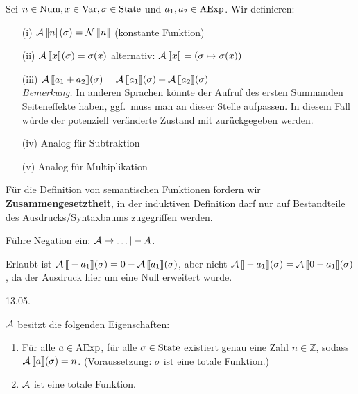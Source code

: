 \begin{definition}\label{def:Asem}
    Sei $n \in \Num, x \in \Var, \sigma \in \State$ und $a_1, a_2 \in \AExp$. Wir definieren:
    \begin{enumerate}
        \item[(i)] $\A\lsem n \rsem(\sigma) = \N\lsem n \rsem$ \quad\quad (konstante Funktion)
        \item[(ii)] $\A\lsem x \rsem(\sigma) = \sigma(x)$ \quad\quad\quad alternativ: $\A\lsem x \rsem = (\sigma \mapsto \sigma(x))$
        \item[(iii)] $\A\lsem a_1 + a_2 \rsem(\sigma) = \A\lsem a_1 \rsem(\sigma) + \A\lsem a_2 \rsem(\sigma)$ \\[4pt]
        \emph{Bemerkung.} In anderen Sprachen könnte der Aufruf des ersten Summanden Seiteneffekte haben, \dh{} ggf.\ muss man an dieser Stelle aufpassen. In diesem Fall würde der potenziell veränderte Zustand mit zurückgegeben werden.
        \item[(iv)] Analog für Subtraktion
        \item[(v)] Analog für Multiplikation
    \end{enumerate}
\end{definition}

\begin{remark}
    Für die Definition von semantischen Funktionen fordern wir \textbf{Zusammengesetztheit}, \dh{} in der induktiven Definition darf nur auf Bestandteile des Ausdrucks/Syntaxbaums zugegriffen werden.
\end{remark}

\begin{example}
    Führe Negation ein: $\A \to \dots | -A$.

    Erlaubt ist $\A\lsem -a_1 \rsem(\sigma) = 0 - \A\lsem a_1 \rsem(\sigma)$, aber nicht $\A\lsem -a_1 \rsem(\sigma) = \A\lsem 0 - a_1 \rsem(\sigma)$, da der Ausdruck hier um eine Null erweitert wurde.
\end{example}



\newpage
\hfill 13.05.

\begin{theorem}
    $\A$ besitzt die folgenden Eigenschaften:
    \begin{enumerate}
        \item Für alle $a \in \AExp$, für alle $\sigma \in \State$ existiert genau eine Zahl $n \in \mathbb{Z}$, sodass $\A\lsem a \rsem (\sigma) = n$. (Voraussetzung: $\sigma$ ist eine totale Funktion.)
        \item $\A$ ist eine totale Funktion.
    \end{enumerate}
\end{theorem}

